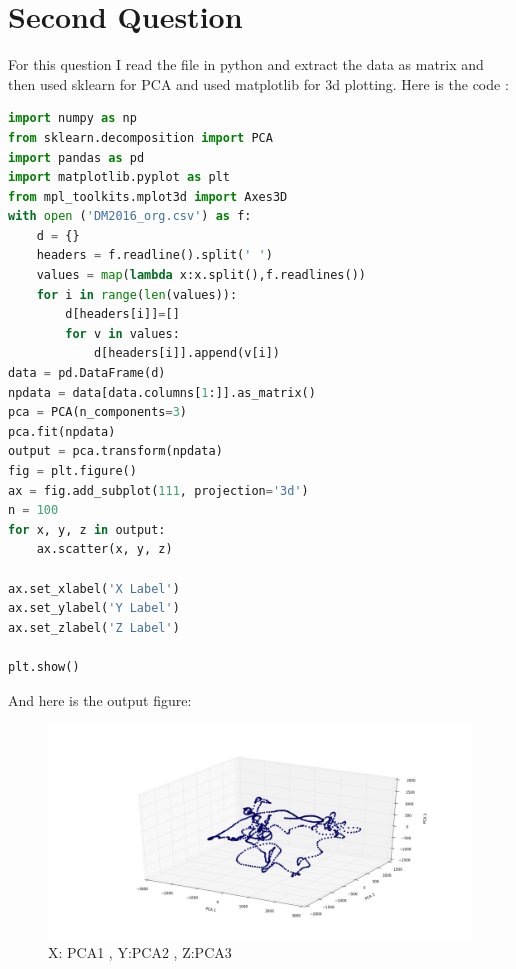 \documentclass{article}
\begin{document}
\section*{Second Question}
For this question I read the file in python and extract the data as matrix and then used sklearn for PCA and used matplotlib for 3d plotting. Here is the code :
\begin{lstlisting}[language=Python]
import numpy as np
from sklearn.decomposition import PCA
import pandas as pd
import matplotlib.pyplot as plt
from mpl_toolkits.mplot3d import Axes3D
with open ('DM2016_org.csv') as f:
    d = {}
    headers = f.readline().split(' ')
    values = map(lambda x:x.split(),f.readlines())
    for i in range(len(values)):
        d[headers[i]]=[]
        for v in values:
            d[headers[i]].append(v[i])
data = pd.DataFrame(d)
npdata = data[data.columns[1:]].as_matrix()
pca = PCA(n_components=3)
pca.fit(npdata)
output = pca.transform(npdata)
fig = plt.figure()
ax = fig.add_subplot(111, projection='3d')
n = 100
for x, y, z in output:
    ax.scatter(x, y, z)

ax.set_xlabel('X Label')
ax.set_ylabel('Y Label')
ax.set_zlabel('Z Label')

plt.show()
\end{lstlisting}
And here is the output figure:
\begin{figure}[H]
\includegraphics[scale=0.5,trim={8cm 2cm 10cm 5cm},clip]{3D.png}
\caption{X: PCA1 , Y:PCA2 , Z:PCA3}
\end{figure}
\end{document}
